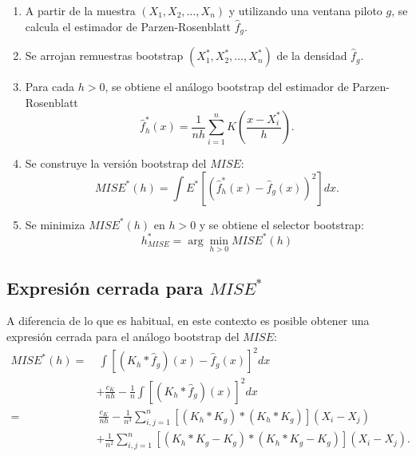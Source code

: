 \documentclass[
]{book}
\theoremstyle{break}
\theoremstyle{nonumberplain}
\begin{document}
\begin{enumerate}
\def\labelenumi{\arabic{enumi}.}
\item
  A partir de la muestra \(\left( X_1,X_2,\ldots ,X_n \right)\) y
  utilizando una ventana piloto \(g\), se calcula el estimador de
  Parzen-Rosenblatt \(\hat{f}_{g}\).
\item
  Se arrojan remuestras bootstrap \(\left( X_1^{\ast},X_2^{\ast
  },\ldots ,X_n^{\ast} \right)\) de la densidad \(\hat{f}_{g}\).
\item
  Para cada \(h>0\), se obtiene el análogo bootstrap del estimador de
  Parzen-Rosenblatt
  \[\hat{f}_{h}^{\ast}\left( x \right) =\frac{1}{nh}\sum_{i=1}^{n}K\left( \frac{
  x-X_i^{\ast}}{h} \right).\]
\item
  Se construye la versión bootstrap del
  \(MISE\):\[MISE^{\ast}\left( h \right) =\int E^{\ast}\left[ \left( \hat{f}_{h}^{\ast
  }\left( x \right) -\hat{f}_{g}\left( x \right) \right)^2\right] dx.\]
\item
  Se minimiza \(MISE^{\ast}\left( h \right)\) en \(h>0\) y se obtiene el
  selector bootstrap:
  \[h_{MISE}^{\ast}=\arg \min_{h>0}MISE^{\ast}\left( h \right)\]
\end{enumerate}

\subsection{\texorpdfstring{Expresión cerrada para \(MISE^{\ast}\)}{Expresión cerrada para MISE\^{}\{\textbackslash ast\}}}\label{expresiuxf3n-cerrada-para-miseast}

A diferencia de lo que es habitual, en este contexto es posible obtener
una expresión cerrada para el análogo bootstrap del \(MISE\):
\[\begin{aligned}
MISE^{\ast}\left( h \right) =&\ \int \left[ \left( K_{h}\ast 
\hat{f}_{g} \right) \left( x \right) -\hat{f}_{g}\left( x \right) \right]^2dx \\
&+\frac{c_{K}}{nh}-\frac{1}{n}\int \left[ \left( K_{h}\ast 
\hat{f}_{g} \right) \left( x \right) \right]^2dx \\
=&\ \frac{c_{K}}{nh}-\frac{1}{n^{3}}\sum_{i,j=1}^{n}\left[ \left( K_{h}\ast
K_{g} \right) \ast \left( K_{h}\ast K_{g} \right) \right] \left(
X_i-X_j \right) \\
&+\frac{1}{n^2}\sum_{i,j=1}^{n}\left[ \left( K_{h}\ast K_{g}-K_{g} \right)
\ast \left( K_{h}\ast K_{g}-K_{g} \right) \right] \left( X_i-X_j \right).\end{aligned}\]
\end{document}
